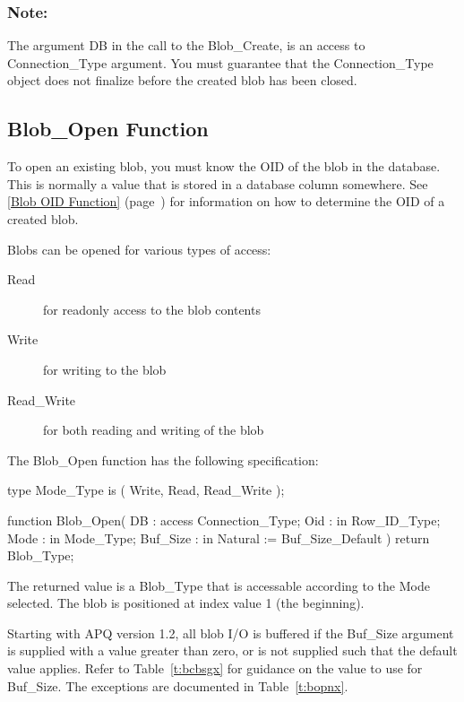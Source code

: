 \documentclass[english,letterpaper]{book}
\newcommand\Ref[1]{\textsection\ref{#1} (page~\pageref{#1})}
\begin{document}
\subsubsection{Note:}

The argument DB in the call to the Blob\_Create, is an access
to Connection\_Type argument. You must guarantee that the Connection\_Type
object does not finalize before the created blob has been closed.


\subsection{Blob\_Open Function\label{Blob_Open Function}}

To open an existing blob, you must know the OID of the blob in the
database. This is normally a value that is stored in a database column
somewhere. See \Ref{Blob OID Function} for information on
how to determine the OID of a created blob.%

Blobs can be opened for various types of access:

\begin{description}
   \item [Read] for readonly access to the blob contents
   \item [Write] for writing to the blob
   \item [Read\_Write] for both reading and writing of the blob
\end{description}

The Blob\_Open function has the following specification:

\begin{Code}
type Mode_Type is (
   Write,
   Read,
   Read_Write
);

function Blob_Open(
   DB :       access Connection_Type;
   Oid :      in     Row_ID_Type;
   Mode :     in     Mode_Type;
   Buf_Size : in     Natural := Buf_Size_Default
) return Blob_Type;
\end{Code}

The returned value is a Blob\_Type that is accessable according to
the Mode selected. The blob is positioned at index value 1
(the beginning).

Starting with APQ version 1.2, all blob I/O is buffered if the Buf\_Size
argument is supplied with a value greater than zero, or is not supplied
such that the default value applies. Refer to Table~\ref{t:bcbsgx} for guidance on
the value to use for Buf\_Size. The exceptions are documented
in Table~\ref{t:bopnx}.
\end{document}

